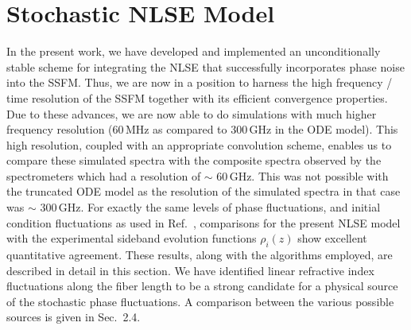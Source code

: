 \section{Stochastic NLSE Model}

In the present work, we have developed and implemented an unconditionally 
stable scheme for integrating the NLSE that successfully incorporates phase 
noise into the SSFM. Thus, we are now in a position to harness the high 
frequency / time resolution of the SSFM together with its efficient 
convergence properties. Due to these advances, we are now able to do 
simulations with much higher frequency resolution (60\,MHz as compared to 
300\,GHz in the ODE model). This high resolution, coupled with an appropriate 
convolution scheme, enables us to compare these simulated spectra with the 
composite spectra observed by the spectrometers which had a resolution of 
$\sim$ 60\,GHz. This was not possible with the truncated ODE model as the 
resolution of the simulated spectra in that case was $\sim$ 300\,GHz. For 
exactly the same levels of phase fluctuations, and initial condition 
fluctuations as used in Ref.\ \cite{hart1}, comparisons for the present NLSE 
model with the experimental sideband evolution functions $\rho_i(z)$ show 
excellent quantitative agreement. These results, along with the algorithms 
employed, are described in detail in this section. We have identified linear 
refractive index fluctuations along the fiber length to be a strong candidate 
for a physical source of the stochastic phase fluctuations. A comparison 
between the various possible sources is given in Sec.\ 2.4.

